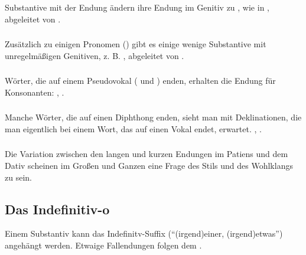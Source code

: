 \subsubsection{} Substantive mit der Endung  \"andern ihre Endung
im Genitiv zu , wie in , abgeleitet von .

\subsubsection{} Zus\"atzlich zu einigen Pronomen ()
gibt es einige wenige Substantive mit unregelm\"a\ss{}igen Genitiven, z. B.
, abgeleitet von .

\subsubsection{} W\"orter, die auf einem Pseudovokal ( und ) enden,
erhalten die Endung f\"ur Konsonanten: , .
\label{morph:decl:pseudovowel}

\subsubsection{} Manche W\"orter, die auf einen Diphthong enden, sieht man mit
Deklinationen, die man eigentlich bei einem Wort, das auf einen Vokal endet, erwartet.
, .

\subsubsection{} Die Variation zwischen den langen und kurzen Endungen im Patiens und dem
Dativ scheinen im Gro\ss{}en und Ganzen eine Frage des Stils und des Wohlklangs zu sein.

\subsection{Das Indefinitiv-o} Einem Substantiv kann das Indefinitv-Suffix 
("`(irgend)einer, (irgend)etwas"') angeh\"angt werden. Etwaige Fallendungen folgen dem
.

